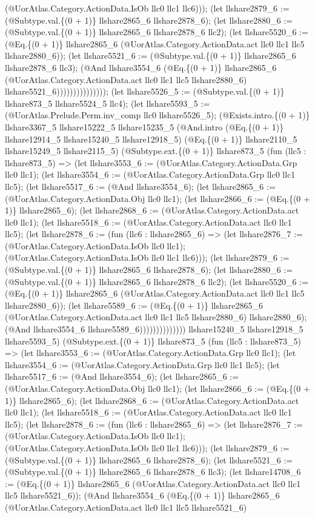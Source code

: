 \documentclass[11pt]{article}
\begin{document}
(@UorAtlas.Category.ActionData.IsOb llc0 llc1 llc6))); (let llshare2879\_6 := (@Subtype.val.\{(0 + 1)\} llshare2865\_6 llshare2878\_6); (let llshare2880\_6 := (@Subtype.val.\{(0 + 1)\} llshare2865\_6 llshare2878\_6 llc2); (let llshare5520\_6 := (@Eq.\{(0 + 1)\} llshare2865\_6 (@UorAtlas.Category.ActionData.act llc0 llc1 llc5 llshare2880\_6)); (let llshare5521\_6 := (@Subtype.val.\{(0 + 1)\} llshare2865\_6 llshare2878\_6 llc3); (@And llshare3554\_6 (@Eq.\{(0 + 1)\} llshare2865\_6 (@UorAtlas.Category.ActionData.act llc0 llc1 llc5 llshare2880\_6) llshare5521\_6))))))))))))))); (let llshare5526\_5 := (@Subtype.val.\{(0 + 1)\} llshare873\_5 llshare5524\_5 llc4); (let llshare5593\_5 := (@UorAtlas.Prelude.Perm.inv\_comp llc0 llshare5526\_5); (@Exists.intro.\{(0 + 1)\} llshare3367\_5 llshare15222\_5 llshare15235\_5 (@And.intro (@Eq.\{(0 + 1)\} llshare12914\_5 llshare15240\_5 llshare12918\_5) (@Eq.\{(0 + 1)\} llshare2110\_5 llshare15249\_5 llshare2115\_5) (@Subtype.ext.\{(0 + 1)\} llshare873\_5 (fun (llc5 : llshare873\_5) => (let llshare3553\_6 := (@UorAtlas.Category.ActionData.Grp llc0 llc1); (let llshare3554\_6 := (@UorAtlas.Category.ActionData.Grp llc0 llc1 llc5); (let llshare5517\_6 := (@And llshare3554\_6); (let llshare2865\_6 := (@UorAtlas.Category.ActionData.Obj llc0 llc1); (let llshare2866\_6 := (@Eq.\{(0 + 1)\} llshare2865\_6); (let llshare2868\_6 := (@UorAtlas.Category.ActionData.act llc0 llc1); (let llshare5518\_6 := (@UorAtlas.Category.ActionData.act llc0 llc1 llc5); (let llshare2878\_6 := (fun (llc6 : llshare2865\_6) => (let llshare2876\_7 := (@UorAtlas.Category.ActionData.IsOb llc0 llc1); (@UorAtlas.Category.ActionData.IsOb llc0 llc1 llc6))); (let llshare2879\_6 := (@Subtype.val.\{(0 + 1)\} llshare2865\_6 llshare2878\_6); (let llshare2880\_6 := (@Subtype.val.\{(0 + 1)\} llshare2865\_6 llshare2878\_6 llc2); (let llshare5520\_6 := (@Eq.\{(0 + 1)\} llshare2865\_6 (@UorAtlas.Category.ActionData.act llc0 llc1 llc5 llshare2880\_6)); (let llshare5589\_6 := (@Eq.\{(0 + 1)\} llshare2865\_6 (@UorAtlas.Category.ActionData.act llc0 llc1 llc5 llshare2880\_6) llshare2880\_6); (@And llshare3554\_6 llshare5589\_6)))))))))))))) llshare15240\_5 llshare12918\_5 llshare5593\_5) (@Subtype.ext.\{(0 + 1)\} llshare873\_5 (fun (llc5 : llshare873\_5) => (let llshare3553\_6 := (@UorAtlas.Category.ActionData.Grp llc0 llc1); (let llshare3554\_6 := (@UorAtlas.Category.ActionData.Grp llc0 llc1 llc5); (let llshare5517\_6 := (@And llshare3554\_6); (let llshare2865\_6 := (@UorAtlas.Category.ActionData.Obj llc0 llc1); (let llshare2866\_6 := (@Eq.\{(0 + 1)\} llshare2865\_6); (let llshare2868\_6 := (@UorAtlas.Category.ActionData.act llc0 llc1); (let llshare5518\_6 := (@UorAtlas.Category.ActionData.act llc0 llc1 llc5); (let llshare2878\_6 := (fun (llc6 : llshare2865\_6) => (let llshare2876\_7 := (@UorAtlas.Category.ActionData.IsOb llc0 llc1); (@UorAtlas.Category.ActionData.IsOb llc0 llc1 llc6))); (let llshare2879\_6 := (@Subtype.val.\{(0 + 1)\} llshare2865\_6 llshare2878\_6); (let llshare5521\_6 := (@Subtype.val.\{(0 + 1)\} llshare2865\_6 llshare2878\_6 llc3); (let llshare14708\_6 := (@Eq.\{(0 + 1)\} llshare2865\_6 (@UorAtlas.Category.ActionData.act llc0 llc1 llc5 llshare5521\_6)); (@And llshare3554\_6 (@Eq.\{(0 + 1)\} llshare2865\_6 (@UorAtlas.Category.ActionData.act llc0 llc1 llc5 llshare5521\_6) 
\end{document}
